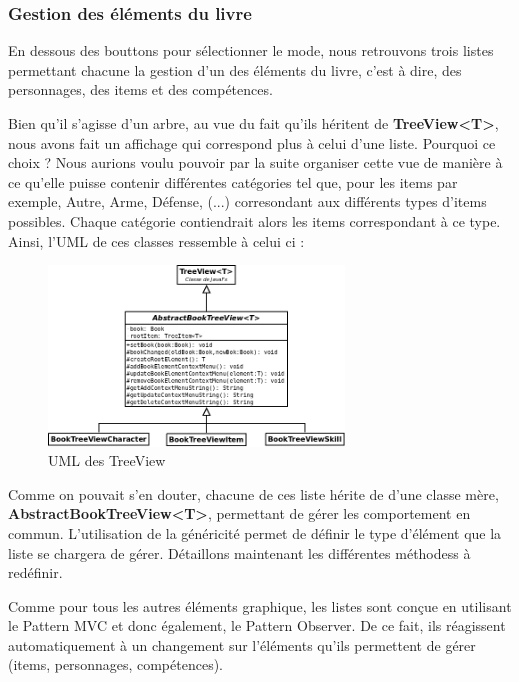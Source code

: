 			\subsubsection{Gestion des éléments du livre}

				En dessous des bouttons pour sélectionner le mode, nous retrouvons trois listes permettant chacune la gestion d'un des éléments du livre, c'est à dire, des personnages, des items et des compétences.

				Bien qu'il s'agisse d'un arbre, au vue du fait qu'ils héritent de \textbf{TreeView<T>}, nous avons fait un affichage qui correspond plus à celui d'une liste. Pourquoi ce choix ? Nous aurions voulu pouvoir par la suite organiser cette vue de manière à ce qu'elle puisse contenir différentes catégories tel que, pour les items par exemple, Autre, Arme, Défense, (...) corresondant aux différents types d'items possibles. Chaque catégorie contiendrait alors les items correspondant à ce type. Ainsi, l'UML de ces classes ressemble à celui ci :

				\begin{figure}[H]
					\centering\includegraphics[width=0.7\textwidth]{img/fenetreTreeView.png}
					\caption{UML des TreeView}
					\label{fig:fenetreTreeView}
				\end{figure}

				Comme on pouvait s'en douter, chacune de ces liste hérite de d'une classe mère, \textbf{AbstractBookTreeView<T>}, permettant de gérer les comportement en commun. L'utilisation de la généricité permet de définir le type d'élément que la liste se chargera de gérer. Détaillons maintenant les différentes méthodess à redéfinir.

				Comme pour tous les autres éléments graphique, les listes sont conçue en utilisant le Pattern MVC et donc également, le Pattern Observer. De ce fait, ils réagissent automatiquement à un changement sur l'éléments qu'ils permettent de gérer (items, personnages, compétences).

